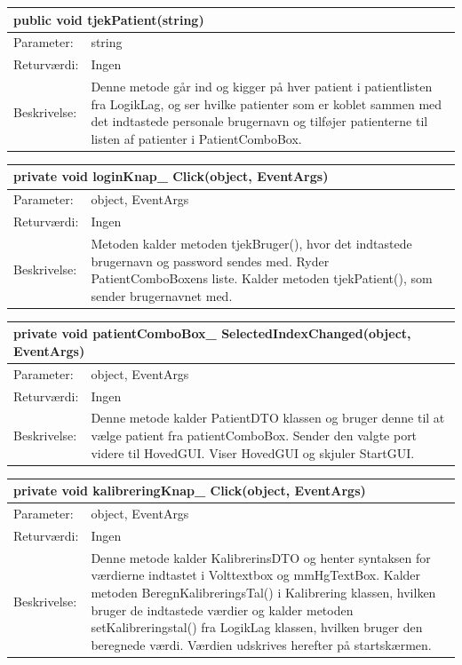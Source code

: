 \begin{table}[H]
\label{tab:tabel2}
\begin{tabular}{| l | p{13cm} |}
   \hline
   \multicolumn{2}{|l|}{public void tjekPatient(string)} \\ \hline
   Parameter: & string\\ \hline
   Returværdi: & Ingen \\ \hline
   Beskrivelse: & Denne metode går ind og kigger på hver patient i patientlisten fra LogikLag, og ser hvilke patienter som er koblet sammen med det indtastede personale brugernavn og tilføjer patienterne til listen af patienter i PatientComboBox.\\ \hline
\end{tabular}
\end{table}
\begin{table}[H]
\label{tab:tabel2}
\begin{tabular}{| l | p{13cm} |}
   \hline
   \multicolumn{2}{|l|}{private void loginKnap\_ Click(object, EventArgs)} \\ \hline
   Parameter: & object, EventArgs\\ \hline
   Returværdi: & Ingen \\ \hline
   Beskrivelse: & Metoden kalder metoden tjekBruger(), hvor det indtastede brugernavn og password sendes med. Ryder PatientComboBoxens liste. Kalder metoden tjekPatient(), som sender brugernavnet med.\\ \hline
\end{tabular}
\end{table}
\begin{table}[H]
\label{tab:tabel2}
\begin{tabular}{| l | p{13cm} |}
   \hline
   \multicolumn{2}{|l|}{private void patientComboBox\_ SelectedIndexChanged(object, EventArgs)} \\ \hline
   Parameter: & object, EventArgs\\ \hline
   Returværdi: & Ingen \\ \hline
   Beskrivelse: & Denne metode kalder PatientDTO klassen og bruger denne til at vælge patient fra patientComboBox. Sender den valgte port videre til HovedGUI. Viser HovedGUI og skjuler StartGUI.\\ \hline
\end{tabular}
\end{table}
\begin{table}[H]
\label{tab:tabel2}
\begin{tabular}{| l | p{13cm} |}
   \hline
   \multicolumn{2}{|l|}{private void kalibreringKnap\_ Click(object, EventArgs)} \\ \hline
   Parameter: & object, EventArgs\\ \hline
   Returværdi: & Ingen \\ \hline
   Beskrivelse: & Denne metode kalder KalibrerinsDTO og henter syntaksen for værdierne indtastet i Volttextbox og mmHgTextBox. Kalder metoden BeregnKalibreringsTal() i Kalibrering klassen, hvilken bruger de indtastede værdier og kalder metoden setKalibreringstal() fra LogikLag klassen, hvilken bruger den beregnede værdi. Værdien udskrives herefter på startskærmen.\\ \hline
\end{tabular}
\end{table}
